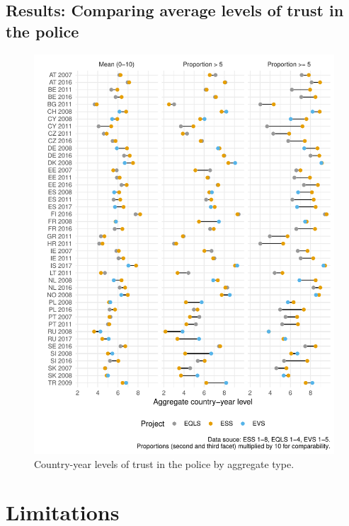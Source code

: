\documentclass[12pt,]{article}
\begin{document}
\hypertarget{results-comparing-average-levels-of-trust-in-the-police}{%
\subsection{Results: Comparing average levels of trust in the police}\label{results-comparing-average-levels-of-trust-in-the-police}}

\begin{figure}
\centering
\includegraphics{Harmonization_working_paper_files/figure-latex/graph-1.pdf}
\caption{\label{fig:graph}Country-year levels of trust in the police by aggregate type.}
\end{figure}

\hypertarget{limitations}{%
\section{Limitations}\label{limitations}}
\end{document}
